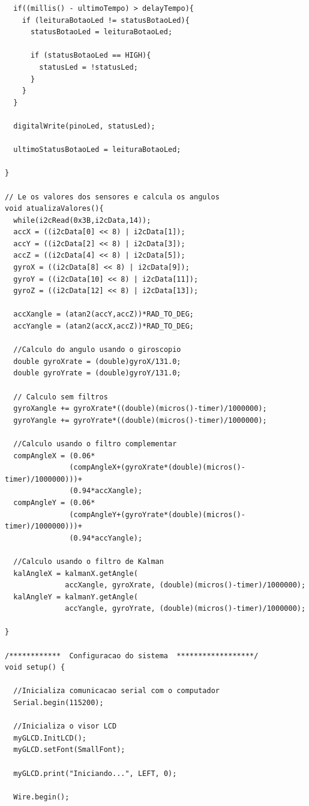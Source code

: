 \documentclass[a4paper,12pt]{article}
\begin{document}
{\begin{lstlisting}
  if((millis() - ultimoTempo) > delayTempo){
    if (leituraBotaoLed != statusBotaoLed){
      statusBotaoLed = leituraBotaoLed;
      
      if (statusBotaoLed == HIGH){
        statusLed = !statusLed;
      }
    }
  }
  
  digitalWrite(pinoLed, statusLed);
  
  ultimoStatusBotaoLed = leituraBotaoLed;
  
}

// Le os valores dos sensores e calcula os angulos
void atualizaValores(){
  while(i2cRead(0x3B,i2cData,14));
  accX = ((i2cData[0] << 8) | i2cData[1]);
  accY = ((i2cData[2] << 8) | i2cData[3]);
  accZ = ((i2cData[4] << 8) | i2cData[5]);
  gyroX = ((i2cData[8] << 8) | i2cData[9]);
  gyroY = ((i2cData[10] << 8) | i2cData[11]);
  gyroZ = ((i2cData[12] << 8) | i2cData[13]);
  
  accXangle = (atan2(accY,accZ))*RAD_TO_DEG;
  accYangle = (atan2(accX,accZ))*RAD_TO_DEG;
  
  //Calculo do angulo usando o giroscopio
  double gyroXrate = (double)gyroX/131.0;
  double gyroYrate = (double)gyroY/131.0;
  
  // Calculo sem filtros  
  gyroXangle += gyroXrate*((double)(micros()-timer)/1000000); 
  gyroYangle += gyroYrate*((double)(micros()-timer)/1000000);
  
  //Calculo usando o filtro complementar
  compAngleX = (0.06*
               (compAngleX+(gyroXrate*(double)(micros()-timer)/1000000)))+
               (0.94*accXangle);
  compAngleY = (0.06*
               (compAngleY+(gyroYrate*(double)(micros()-timer)/1000000)))+
               (0.94*accYangle);
  
  //Calculo usando o filtro de Kalman
  kalAngleX = kalmanX.getAngle(
              accXangle, gyroXrate, (double)(micros()-timer)/1000000);
  kalAngleY = kalmanY.getAngle(
              accYangle, gyroYrate, (double)(micros()-timer)/1000000);
  
}

/************  Configuracao do sistema  ******************/
void setup() {  
  
  //Inicializa comunicacao serial com o computador
  Serial.begin(115200);
  
  //Inicializa o visor LCD
  myGLCD.InitLCD();
  myGLCD.setFont(SmallFont);
  
  myGLCD.print("Iniciando...", LEFT, 0);
  
  Wire.begin();
  

\end{lstlisting}}
\end{document}
